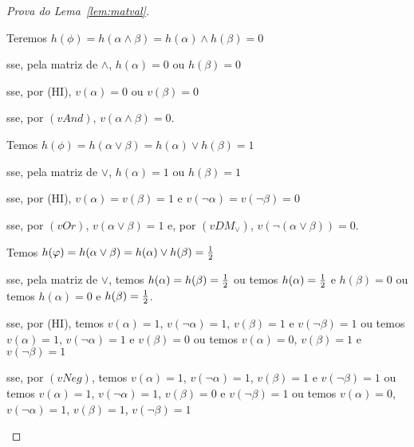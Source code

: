 \begin{proof}[Prova do Lema~\ref{lem:matval}]
\begin{provaporcasos}
\begin{provaporsubcasos}
                    Teremos $h(\phi) = h(\alpha \land \beta) = h(\alpha) \land h(\beta) = 0$

                    \qquad{}sse, pela matriz de $\land$, $h(\alpha) = 0$ ou $h(\beta) = 0$

                    \qquad{}sse, por (HI), $v(\alpha) = 0$ ou $v(\beta) = 0$

                    \qquad{}sse, por $(vAnd)$, $v(\alpha \land \beta) = 0$.

            \end{provaporsubcasos}


            \begin{provaporsubcasos}

                    Temos $h(\phi) = h(\alpha \lor \beta) = h(\alpha) \lor h(\beta) = 1$

                    \qquad{}sse, pela matriz de $\lor$, $h(\alpha) = 1$ ou $h(\beta) = 1$

                    \qquad{}sse, por (HI), $v(\alpha) = v(\beta) = 1$ e $v(\neg \alpha) = v(\neg \beta) = 0$

                    \qquad{}sse, por $(vOr)$, $v(\alpha \lor \beta) = 1$ e, por $(vDM_{\lor})$, $v(\neg(\alpha \lor \beta)) = 0$.


                    Temos $h(\varphi) = h(\alpha \lor \beta) = h(\alpha) \lor h(\beta) = \frac{1}{2}{}$

                    \qquad{}sse, pela matriz de $\lor$, temos $h(\alpha) = h(\beta) = \frac{1}{2}{}$ ou temos $h(\alpha) = \frac{1}{2}{}$ e $h(\beta) = 0$ ou temos $h(\alpha) = 0$ e $h(\beta) = \frac{1}{2}{}$.

                    \qquad{}sse, por (HI), temos $v(\alpha) = 1$, $v(\neg \alpha) = 1$, $v(\beta) = 1$ e $v(\neg \beta) = 1$ ou temos $v(\alpha) = 1$, $v(\neg \alpha) = 1$ e $v(\beta) = 0$ ou temos $v(\alpha) = 0$, $v(\beta) = 1$ e $v(\neg \beta) = 1$

                    \qquad{}sse, por $(vNeg)$, temos $v(\alpha) = 1$, $v(\neg \alpha) = 1$, $v(\beta) = 1$ e $v(\neg \beta) = 1$ ou temos $v(\alpha) = 1$, $v(\neg \alpha) = 1$, $v(\beta) = 0$ e $v(\neg \beta) = 1$ ou temos $v(\alpha) = 0$, $v(\neg \alpha) = 1$, $v(\beta) = 1$, $v(\neg \beta) = 1$


\end{provaporsubcasos}
\end{provaporcasos}
\end{proof}
